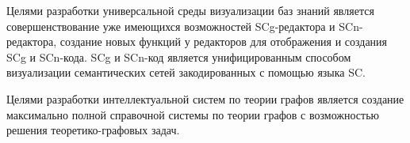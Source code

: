 
\label{sec:intro}
Целями разработки универсальной среды визуализации баз знаний является совершенствование уже имеющихся возможностей SCg-редактора и SCn-редактора, создание новых функций у редакторов для отображения и создания SCg и SCn-кода. SCg и SCn-код является унифицированным способом визуализации семантических сетей закодированных с помощью языка SC.

Целями разработки интеллектуальной систем по теории графов является создание максимально полной справочной системы по теории графов с возможностью решения теоретико-графовых задач.



